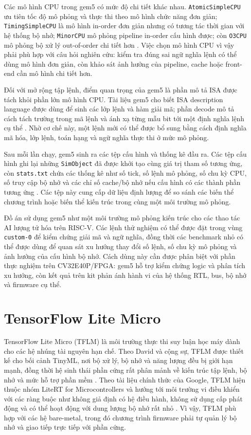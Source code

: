 \documentclass[../DoAn.tex]{subfiles}
\begin{document}
Các mô hình CPU trong gem5 có mức độ chi tiết khác nhau. \texttt{AtomicSimpleCPU} ưu tiên tốc độ mô phỏng và thực thi theo mô hình chức năng đơn giản; \texttt{TimingSimpleCPU} là mô hình in-order đơn giản nhưng có tương tác thời gian với hệ thống bộ nhớ; \texttt{MinorCPU} mô phỏng pipeline in-order cấu hình được; còn \texttt{O3CPU} mô phỏng bộ xử lý out-of-order chi tiết hơn \cite{gem5_docs_2026}. Việc chọn mô hình CPU vì vậy phải phù hợp với câu hỏi nghiên cứu: kiểm tra đúng sai ngữ nghĩa lệnh có thể dùng mô hình đơn giản, còn khảo sát ảnh hưởng của pipeline, cache hoặc front-end cần mô hình chi tiết hơn.

Đối với mở rộng tập lệnh, điểm quan trọng của gem5 là phần mô tả ISA được tách khỏi phần lớn mô hình CPU. Tài liệu gem5 cho biết ISA description language được dùng để sinh các lớp lệnh và hàm giải mã; phần decode mô tả cách tách trường trong mã lệnh và ánh xạ từng mẫu bit tới một định nghĩa lệnh cụ thể \cite{gem5_docs_2026}. Nhờ cơ chế này, một lệnh mới có thể được bổ sung bằng cách định nghĩa mã hóa, lớp lệnh, toán hạng và ngữ nghĩa thực thi ở mức mô phỏng.

Sau mỗi lần chạy, gem5 sinh ra các tệp cấu hình và thống kê đầu ra. Các tệp cấu hình ghi lại những \texttt{SimObject} đã được khởi tạo cùng giá trị tham số tương ứng, còn \texttt{stats.txt} chứa các thống kê như số tick, số lệnh mô phỏng, số chu kỳ CPU, số truy cập bộ nhớ và các chỉ số cache/bộ nhớ nếu cấu hình có các thành phần tương ứng \cite{gem5_docs_2026}. Các tệp này cung cấp dữ liệu định lượng để so sánh các biến thể chương trình hoặc biến thể kiến trúc trong cùng một môi trường mô phỏng.

Đồ án sử dụng gem5 như một môi trường mô phỏng kiến trúc cho các thao tác AI lượng tử hóa trên RISC-V. Các lệnh thử nghiệm có thể được đặt trong vùng \texttt{custom-0} để kiểm chứng giải mã và ngữ nghĩa, đồng thời các benchmark nhỏ có thể được dùng để quan sát xu hướng thay đổi số lệnh, số chu kỳ mô phỏng và ảnh hưởng của cấu hình bộ nhớ. Cách dùng này cần được phân biệt với phần thực nghiệm trên CV32E40P/FPGA: gem5 hỗ trợ kiểm chứng logic và phân tích xu hướng, còn kết quả trên kit phản ánh hành vi của hệ thống RTL, bus, bộ nhớ và firmware cụ thể.

\section{TensorFlow Lite Micro}
\label{sec:tflm}

TensorFlow Lite Micro (TFLM) là môi trường thực thi suy luận học máy dành cho các hệ nhúng tài nguyên hạn chế. Theo David và cộng sự, TFLM được thiết kế cho bối cảnh TinyML, nơi bộ xử lý, bộ nhớ và năng lượng đều bị giới hạn mạnh, đồng thời hệ sinh thái phần cứng rất phân mảnh về kiến trúc tập lệnh, bộ nhớ và mức hỗ trợ phần mềm \cite{david2021tflm}. Theo tài liệu chính thức của Google, TFLM hiện thuộc nhóm LiteRT for Microcontrollers và hướng tới môi trường vi điều khiển với các ràng buộc như không giả định có hệ điều hành, không sử dụng cấp phát động và có thể hoạt động với dung lượng bộ nhớ rất nhỏ \cite{google_litert_micro_2026}. Vì vậy, TFLM phù hợp với các hệ bare-metal, trong đó chương trình firmware phải tự quản lý bộ nhớ và giao tiếp trực tiếp với phần cứng.
\end{document}
